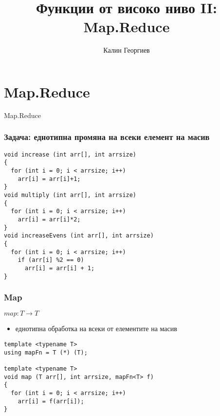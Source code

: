 \documentclass{beamer}
\begin{document}
\title[Обектно ориентирано програмиране]{Функции от високо ниво II: Map.Reduce} 
\author{Калин Георгиев} 
\frame{\titlepage} 


\section{Map.Reduce} 

\begin{frame}
\centerline{Map.Reduce}
\end{frame}

\begin{frame}[fragile]
\frametitle{Задача: еднотипна промяна на всеки елемент на масив}

\begin{flushleft}
\begin{lstlisting}
void increase (int arr[], int arrsize)
{
  for (int i = 0; i < arrsize; i++)
    arr[i] = arr[i]+1;
}
void multiply (int arr[], int arrsize)
{
  for (int i = 0; i < arrsize; i++)
    arr[i] = arr[i]*2;
}
void increaseEvens (int arr[], int arrsize)
{
  for (int i = 0; i < arrsize; i++)
    if (arr[i] %2 == 0)
      arr[i] = arr[i] + 1;
}
\end{lstlisting}  
\end{flushleft}

  
\end{frame}


\begin{frame}[fragile]
\frametitle{Map}

\begin{center}
$map: T \rightarrow T$
\end{center}

\begin{itemize}
  \item еднотипна обработка на всеки от елементите на масив
\end{itemize}

\begin{flushleft}
\begin{lstlisting}
template <typename T>
using mapFn = T (*) (T);

template <typename T>
void map (T arr[], int arrsize, mapFn<T> f)
{
  for (int i = 0; i < arrsize; i++)
    arr[i] = f(arr[i]);
}
\end{lstlisting}  
\end{flushleft}

  
\end{frame}
\end{document}

